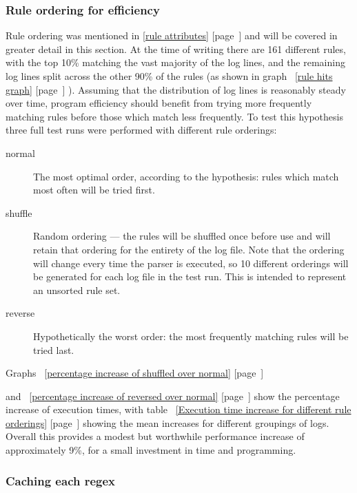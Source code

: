 \documentclass[a4paper,12pt,draft]{article}
\newcommand{\refwithpage}[1]{%
    \empty{}\ref{#1} [page~\pageref{#1}]%
}
\newcommand{\sectionref}[1]{%
    \textsection{}\refwithpage{#1}%
}
\newcommand{\numberOFrules}[0]{%
    161%
}
\begin{document}
\subsubsection{Rule ordering for efficiency}

\label{rule ordering for efficiency}

Rule ordering was mentioned in \sectionref{rule attributes} and will be
covered in greater detail in this section.  At the time of writing there
are \numberOFrules{} different rules, with the top 10\% matching the vast
majority of the log lines, and the remaining log lines split across the
other 90\% of the rules (as shown in graph~\refwithpage{rule hits graph}).
Assuming that the distribution of log lines is reasonably steady over time,
program efficiency should benefit from trying more frequently matching
rules before those which match less frequently.  To test this hypothesis
three full test runs were performed with different rule orderings:

\begin{description}

    \item [normal]  The most optimal order, according to the hypothesis:
        rules which match most often will be tried first.

    \item [shuffle] Random ordering --- the rules will be shuffled once
        before use and will retain that ordering for the entirety of the
        log file.  Note that the ordering will change every time the parser
        is executed, so 10 different orderings will be generated for each
        log file in the test run.  This is intended to represent an
        unsorted rule set.

    \item [reverse] Hypothetically the worst order: the most frequently
        matching rules will be tried last.

\end{description}

Graphs~\refwithpage{percentage increase of shuffled over normal}
and~\refwithpage{percentage increase of reversed over normal} show the
percentage increase of execution times, with table~\refwithpage{Execution
time increase for different rule orderings} showing the mean increases for
different groupings of logs.  Overall this provides a modest but worthwhile
performance increase of approximately 9\%, for a small investment in time
and programming.

\subsubsection{Caching each regex}
\end{document}
